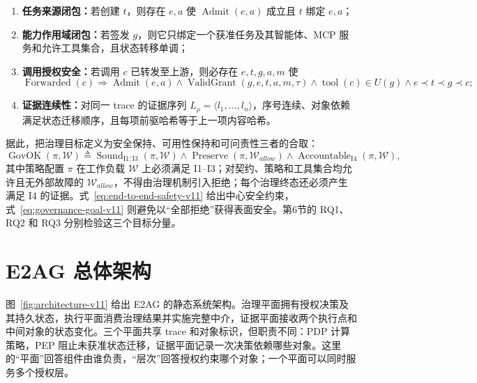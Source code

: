\begin{enumerate}[label=I\arabic*.]
  \item \textbf{任务来源闭包：}若创建 $t$，则存在 $e,a$ 使 $\operatorname{Admit}(e,a)$ 成立且 $t$ 绑定 $e,a$；
  \item \textbf{能力作用域闭包：}若签发 $g$，则它只绑定一个获准任务及其智能体、MCP 服务和允许工具集合，且状态转移单调；
  \item \textbf{调用授权安全：}若调用 $c$ 已转发至上游，则必存在 $e,t,g,a,m$ 使
  \begin{equation}
  \operatorname{Forwarded}(c)\Rightarrow
  \operatorname{Admit}(e,a)\land
  \operatorname{ValidGrant}(g,e,t,a,m,\tau)\land
  \operatorname{tool}(c)\in U(g)\land e\prec t\prec g\prec c;
  \label{eq:end-to-end-safety-v11}
  \end{equation}
  \item \textbf{证据连续性：}对同一 trace 的证据序列 $L_\rho=\langle l_1,\ldots,l_n\rangle$，序号连续、对象依赖满足状态迁移顺序，且每项前驱哈希等于上一项内容哈希。
\end{enumerate}

据此，把治理目标定义为安全保持、可用性保持和可问责性三者的合取：
\begin{equation}
\operatorname{GovOK}(\pi,\mathcal{W})\triangleq
\operatorname{Sound}_{\mathrm{I1:I3}}(\pi,\mathcal{W})\land
\operatorname{Preserve}(\pi,\mathcal{W}_{allow})\land
\operatorname{Accountable}_{\mathrm{I4}}(\pi,\mathcal{W}),
\label{eq:governance-goal-v11}
\end{equation}
其中策略配置 $\pi$ 在工作负载 $\mathcal{W}$ 上必须满足 I1--I3；对契约、策略和工具集合均允许且无外部故障的 $\mathcal{W}_{allow}$，不得由治理机制引入拒绝；每个治理终态还必须产生满足 I4 的证据。式~\eqref{eq:end-to-end-safety-v11} 给出中心安全约束，式~\eqref{eq:governance-goal-v11} 则避免以“全部拒绝”获得表面安全。第6节的 RQ1、RQ2 和 RQ3 分别检验这三个目标分量。

\section{E2AG 总体架构}\label{sec:architecture-v11}



图~\ref{fig:architecture-v11} 给出 E2AG 的静态系统架构。治理平面拥有授权决策及其持久状态，执行平面消费治理结果并实施完整中介，证据平面接收两个执行点和中间对象的状态变化。三个平面共享 trace 和对象标识，但职责不同：PDP 计算策略，PEP 阻止未获准状态迁移，证据平面记录一次决策依赖哪些对象。这里的“平面”回答组件由谁负责，“层次”回答授权约束哪个对象；一个平面可以同时服务多个授权层。

